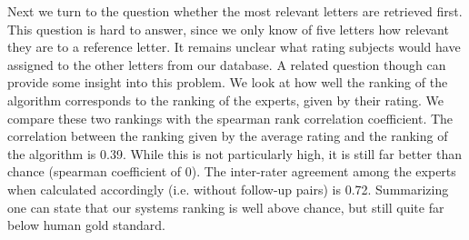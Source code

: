 Next we turn to the question whether the most relevant letters are retrieved first. This question is hard to answer, since we only know of five letters how relevant they are to a reference letter. It remains unclear what rating subjects would have assigned to the other letters from our database. A related question though can provide some insight into this problem. We look at how well the ranking of the algorithm corresponds to the ranking of the experts, given by their rating. We compare these two rankings with the spearman rank correlation coefficient. The correlation between the ranking given by the average rating and the ranking of the algorithm is 0.39. While this is not particularly high, it is still far better than chance (spearman coefficient of 0). The inter-rater agreement among the experts when calculated accordingly (i.e. without follow-up pairs) is 0.72. Summarizing one can state that our systems ranking is well above chance, but still quite far below human gold standard.





